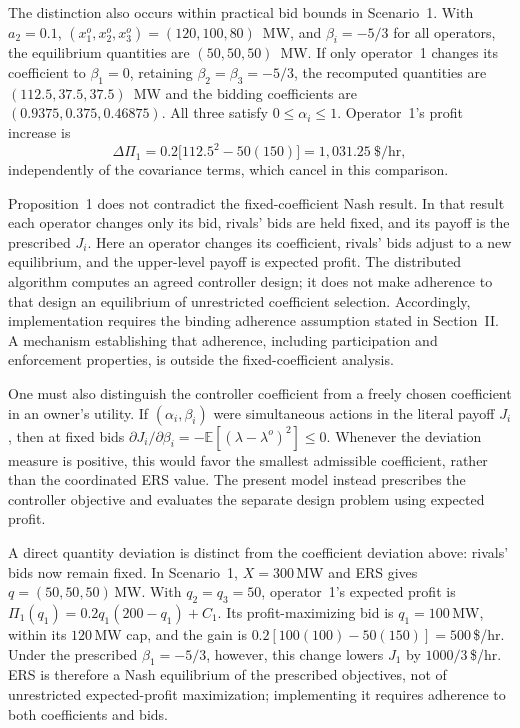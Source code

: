 \documentclass[journal]{IEEEtran}
\begin{document}
The distinction also occurs within practical bid bounds in Scenario~1. With $a_2=0.1$, $(x_1^o,x_2^o,x_3^o)=(120,100,80)$~MW, and $\beta_i=-5/3$ for all operators, the equilibrium quantities are $(50,50,50)$~MW. If only operator~1 changes its coefficient to $\beta_1=0$, retaining $\beta_2=\beta_3=-5/3$, the recomputed quantities are $(112.5,37.5,37.5)$~MW and the bidding coefficients are $(0.9375,0.375,0.46875)$. All three satisfy $0\leq\alpha_i\leq1$. Operator~1's profit increase is
\[
\Delta\Pi_1
=0.2\bigl[112.5^2-50(150)\bigr]
=1{,}031.25~\text{\$/hr},
\]
independently of the covariance terms, which cancel in this comparison.

Proposition~1 does not contradict the fixed-coefficient Nash result. In that result each operator changes only its bid, rivals' bids are held fixed, and its payoff is the prescribed $J_i$. Here an operator changes its coefficient, rivals' bids adjust to a new equilibrium, and the upper-level payoff is expected profit. The distributed algorithm computes an agreed controller design; it does not make adherence to that design an equilibrium of unrestricted coefficient selection. Accordingly, implementation requires the binding adherence assumption stated in Section~II. A mechanism establishing that adherence, including participation and enforcement properties, is outside the fixed-coefficient analysis.

One must also distinguish the controller coefficient from a freely chosen coefficient in an owner's utility. If $(\alpha_i,\beta_i)$ were simultaneous actions in the literal payoff $J_i$, then at fixed bids $\partial J_i/\partial\beta_i=-\mathbb E[(\lambda-\lambda^o)^2]\leq0$. Whenever the deviation measure is positive, this would favor the smallest admissible coefficient, rather than the coordinated ERS value. The present model instead prescribes the controller objective and evaluates the separate design problem using expected profit.


A direct quantity deviation is distinct from the coefficient deviation above: rivals' bids now remain fixed. In Scenario~1, $X=300$\,MW and ERS gives $q=(50,50,50)$\,MW. With $q_2=q_3=50$, operator~1's expected profit is $\Pi_1(q_1)=0.2q_1(200-q_1)+C_1$. Its profit-maximizing bid is $q_1=100$\,MW, within its $120$\,MW cap, and the gain is $0.2[100(100)-50(150)]=500$\,\$/hr. Under the prescribed $\beta_1=-5/3$, however, this change lowers $J_1$ by $1000/3$\,\$/hr. ERS is therefore a Nash equilibrium of the prescribed objectives, not of unrestricted expected-profit maximization; implementing it requires adherence to both coefficients and bids.
\end{document}
